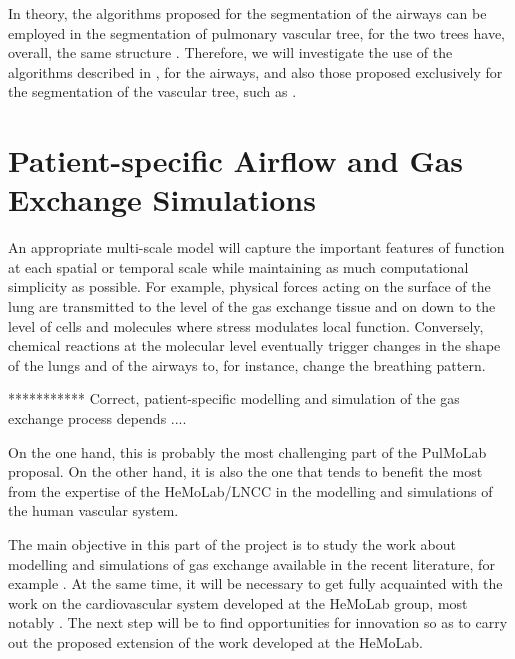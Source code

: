 \approach

In theory, the algorithms proposed for the segmentation of the airways can be employed in the segmentation of pulmonary vascular tree, for the two trees have, overall, the same structure \citep{TawhaiM2011}. Therefore, we will investigate the use of the algorithms described in \citep{Lo}, for the airways, and also those proposed exclusively for the segmentation of the vascular tree, such as \citep{Dongen,Ebrahimdoost,Gutierrez,Linguraru,Shikata,Wala}.


\section{Patient-specific Airflow and Gas Exchange Simulations}

\challenge

An appropriate multi-scale model will capture the important features of function at each spatial or temporal scale while maintaining as much computational simplicity as possible. For example, physical forces acting on the surface of the lung are transmitted to the level of the gas exchange tissue and on down to the level of cells and molecules where stress modulates local function. Conversely, chemical reactions at the molecular level eventually trigger changes in the shape of the lungs and of the airways to, for instance, change the breathing pattern.

*********** Correct, patient-specific modelling and simulation of the gas exchange process depends ....

On the one hand, this is probably the most challenging part of the PulMoLab proposal. On the other hand, it is also the one that tends to benefit the most from the expertise of the HeMoLab/LNCC in the modelling and simulations of the human vascular system. 

\approach

The main objective in this part of the project is to study the work about modelling and simulations of gas exchange available in the recent literature, for example \citep{TawhaiM2011,Tawhai2010,Tawhai08,Burrowes2005,Lin2009,Werner2009,DeBacker2008,DeBacker2010,Gemci2007}. At the same time, it will be necessary to get fully acquainted with the work on the cardiovascular system developed at the HeMoLab group, most notably \citep{Blanco2007,Blanco2009a,Blanco2010,Blanco2012,Urquiza2006}. The next step will be to find opportunities for innovation so as to carry out the proposed extension of the work developed at the HeMoLab.

